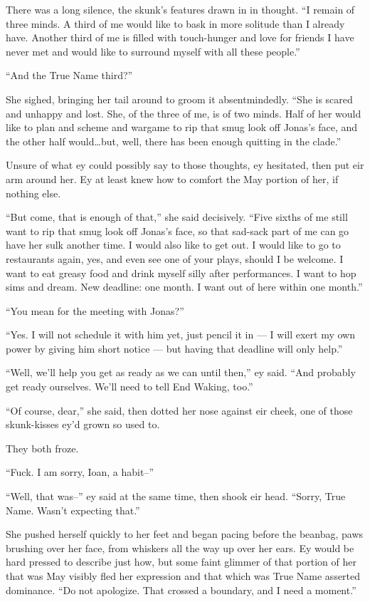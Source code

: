 There was a long silence, the skunk's features drawn in in thought. ``I remain of three minds. A third of me would like to bask in more solitude than I already have. Another third of me is filled with touch-hunger and love for friends I have never met and would like to surround myself with all these people.''

``And the True Name third?''

She sighed, bringing her tail around to groom it absentmindedly. ``She is scared and unhappy and lost. She, of the three of me, is of two minds. Half of her would like to plan and scheme and wargame to rip that smug look off Jonas's face, and the other half would\ldots but, well, there has been enough quitting in the clade.''

Unsure of what ey could possibly say to those thoughts, ey hesitated, then put eir arm around her. Ey at least knew how to comfort the May portion of her, if nothing else.

``But come, that is enough of that,'' she said decisively. ``Five sixths of me still want to rip that smug look off Jonas's face, so that sad-sack part of me can go have her sulk another time. I would also like to get out. I would like to go to restaurants again, yes, and even see one of your plays, should I be welcome. I want to eat greasy food and drink myself silly after performances. I want to hop sims and dream. New deadline: one month. I want out of here within one month.''

``You mean for the meeting with Jonas?''

``Yes. I will not schedule it with him yet, just pencil it in — I will exert my own power by giving him short notice — but having that deadline will only help.''

``Well, we'll help you get as ready as we can until then,'' ey said. ``And probably get ready ourselves. We'll need to tell End Waking, too.''

``Of course, dear,'' she said, then dotted her nose against eir cheek, one of those skunk-kisses ey'd grown so used to.

They both froze.

``Fuck. I am sorry, Ioan, a habit--''

``Well, that was--'' ey said at the same time, then shook eir head. ``Sorry, True Name. Wasn't expecting that.''

She pushed herself quickly to her feet and began pacing before the beanbag, paws brushing over her face, from whiskers all the way up over her ears. Ey would be hard pressed to describe just how, but some faint glimmer of that portion of her that was May visibly fled her expression and that which was True Name asserted dominance. ``Do not apologize. That crossed a boundary, and I need a moment.''


